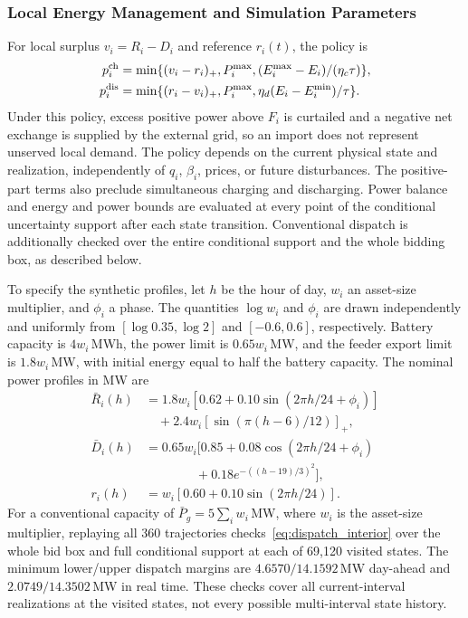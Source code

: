 \documentclass[journal]{IEEEtran}
\begin{document}
\subsubsection{Local Energy Management and Simulation Parameters}
For local surplus $v_i=R_i-D_i$ and reference $r_i(t)$, the policy is
\begin{align}
 p_i^{\rm ch}&=\min\{(v_i-r_i)_+,P_i^{\max},(E_i^{\max}-E_i)/(\eta_c\tau)\},\nonumber\\
 p_i^{\rm dis}&=\min\{(r_i-v_i)_+,P_i^{\max},\eta_d(E_i-E_i^{\min})/\tau\}.
 \label{eq:local_storage_policy}
\end{align}
Under this policy, excess positive power above $F_i$ is curtailed and a negative net exchange is supplied by the external grid, so an import does not represent unserved local demand. The policy depends on the current physical state and realization, independently of $q_i$, $\beta_i$, prices, or future disturbances. The positive-part terms also preclude simultaneous charging and discharging. Power balance and energy and power bounds are evaluated at every point of the conditional uncertainty support after each state transition. Conventional dispatch is additionally checked over the entire conditional support and the whole bidding box, as described below.

To specify the synthetic profiles, let $h$ be the hour of day, $w_i$ an asset-size multiplier, and $\phi_i$ a phase. The quantities $\log w_i$ and $\phi_i$ are drawn independently and uniformly from $[\log0.35,\log2]$ and $[-0.6,0.6]$, respectively. Battery capacity is $4w_i$\,MWh, the power limit is $0.65w_i$\,MW, and the feeder export limit is $1.8w_i$\,MW, with initial energy equal to half the battery capacity. The nominal power profiles in MW are
\begin{align*}
 \bar R_i(h)&=1.8w_i[0.62+0.10\sin(2\pi h/24+\phi_i)]\\
 &\quad+2.4w_i[\sin(\pi(h-6)/12)]_+,\\
 \bar D_i(h)&=0.65w_i[0.85+0.08\cos(2\pi h/24+\phi_i)\\
 &\qquad\qquad+0.18e^{-((h-19)/3)^2}],\\
 r_i(h)&=w_i[0.60+0.10\sin(2\pi h/24)].
\end{align*}
For a conventional capacity of $\bar P_g=5\sum_i w_i$\,MW, where $w_i$ is the asset-size multiplier, replaying all 360 trajectories checks~\eqref{eq:dispatch_interior} over the whole bid box and full conditional support at each of 69,120 visited states. The minimum lower/upper dispatch margins are $4.6570/14.1592$\,MW day-ahead and $2.0749/14.3502$\,MW in real time. These checks cover all current-interval realizations at the visited states, not every possible multi-interval state history.
\end{document}
